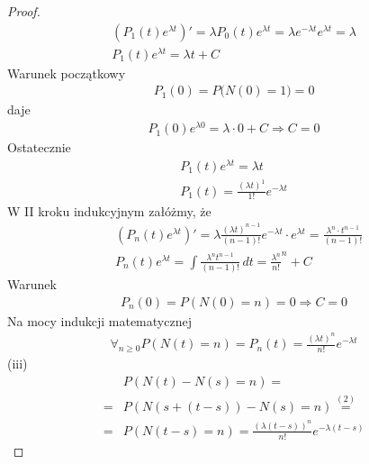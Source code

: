 \begin{proof}
\begin{gather*}
\left(P_1(t)e^{\lambda t}\right)'=\lambda P_{0}(t)e^{\lambda t}=\lambda e^{-\lambda t} e^{\lambda t}=\lambda\\
P_1(t) e^{\lambda t}=\lambda t+C
\end{gather*}
Warunek początkowy
\begin{gather*}
P_1(0)=P\bigl(N(0)=1\bigr)=0
\end{gather*}
daje
\begin{gather*}
P_1(0)e^{\lambda 0}=\lambda\cdot 0 +C\Rightarrow C=0
\end{gather*}
Ostatecznie
\begin{gather*}
P_1(t) e^{\lambda t}=\lambda t\\
P_1(t)=\frac{\left(\lambda t\right)^1}{1!} e^{-\lambda t}
\end{gather*}
W II kroku indukcyjnym załóżmy, że
\begin{align*}
&\left(P_n\left(t\right)e^{\lambda t}\right)'=
\lambda\frac{\left(\lambda t\right)^{n-1}}{(n-1)!}e^{-\lambda t}\cdot e^{\lambda t}=
\frac{\lambda^n\cdot  t^{n-1}}{(n-1)!}\\
&P_n\left(t\right)e^{\lambda t}=
\int \frac{\lambda ^n t^{n-1}}{(n-1)!} \, dt=
\frac{\lambda ^n}{n!} ^n+C
\end{align*}
Warunek
\begin{gather*}
P_n(0)=
P\left(N(0)=n\right)=0\Rightarrow C=0
\end{gather*}
Na mocy indukcji matematycznej
\begin{gather*}
\forall_{n\ge 0}P\left(N(t)=n\right)=P_n(t)=\frac{(\lambda t)^n}{n!}e^{-\lambda t}
\end{gather*}
(iii)
\begin{align*}
& P\left(N(t)-N(s)=n\right)
=\\=&
P\left(N(s+(t-s))-N(s)=n\right)
\stackrel{(2)}{=}\\=&
P\left(N(t-s)=n\right)=
\frac{(\lambda(t-s))^n}{n!}e^{-\lambda(t-s)}
\end{align*}
\end{proof}

